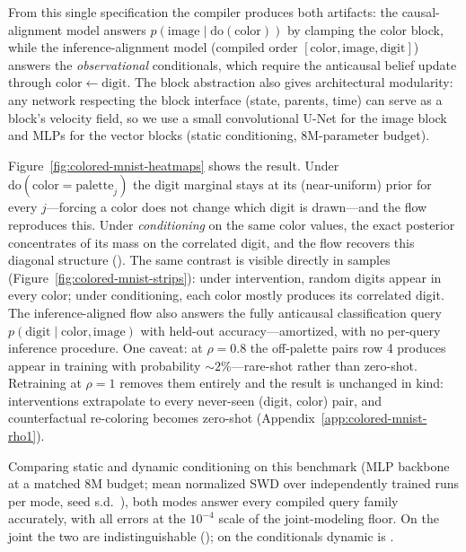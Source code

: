 From this single specification the compiler produces both artifacts: the causal-alignment model answers $p(\mathrm{image} \mid \mathrm{do}(\mathrm{color}))$ by clamping the color block, while the inference-alignment model (compiled order $[\mathrm{color}, \mathrm{image}, \mathrm{digit}]$) answers the \emph{observational} conditionals, which require the anticausal belief update through $\mathrm{color} \leftarrow \mathrm{digit}$. The block abstraction also gives architectural modularity: any network respecting the block interface (state, parents, time) can serve as a block's velocity field, so we use a small convolutional U-Net for the image block and MLPs for the vector blocks (static conditioning, 8M-parameter budget).

Figure~\ref{fig:colored-mnist-heatmaps} shows the result. Under $\mathrm{do}(\mathrm{color}{=}\mathrm{palette}_j)$ the digit marginal stays at its (near-uniform) prior for every $j$---forcing a color does not change which digit is drawn---and the flow reproduces this. Under \emph{conditioning} on the same color values, the exact posterior concentrates  of its mass on the correlated digit, and the flow recovers this diagonal structure (). The same contrast is visible directly in samples (Figure~\ref{fig:colored-mnist-strips}): under intervention, random digits appear in every color; under conditioning, each color mostly produces its correlated digit. The inference-aligned flow also answers the fully anticausal classification query $p(\mathrm{digit} \mid \mathrm{color}, \mathrm{image})$ with  held-out accuracy---amortized, with no per-query inference procedure. One caveat: at $\rho = 0.8$ the off-palette pairs row 4 produces appear in training with probability ${\sim}2\%$---rare-shot rather than zero-shot. Retraining at $\rho = 1$ removes them entirely and the result is unchanged in kind: interventions extrapolate to every never-seen (digit, color) pair, and counterfactual re-coloring becomes zero-shot (Appendix~\ref{app:colored-mnist-rho1}).

Comparing static and dynamic conditioning on this benchmark (MLP backbone at a matched $8$M budget; mean normalized SWD over  independently trained runs per mode, seed s.d.\ ), both modes answer every compiled query family accurately, with all errors at the $10^{-4}$ scale of the joint-modeling floor. On the joint the two are indistinguishable (); on the conditionals dynamic is .

